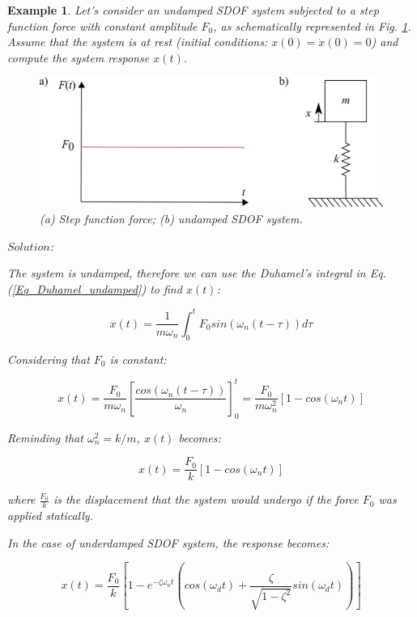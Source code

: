 \documentclass[12pt,letter]{article}
\newtheorem{ex}{Example}
\numberwithin{ex}{section} %
\newenvironment{example}{\begin{mdframed}[middlelinewidth=0.5mm]\begin{ex}\normalfont}{\end{ex}\end{mdframed}}
\numberwithin{re}{section} %
\numberwithin{vcs}{section} %
\begin{document}
\begin{example}
	
	Let's consider an undamped SDOF system subjected to a step function force with constant amplitude $F_0$, as schematically represented in Fig. \ref{fig:step_force}. Assume that the system is at rest (initial conditions: $x(0) = \dot{x}(0) = 0$) and compute the system response $x(t)$. 
	
	\begin{figure}[H]
		\centering
		\includegraphics{../figures/structural_step_function_example.png}
		\caption{(a) Step function force; (b) undamped SDOF system.}
		\label{fig:step_force}
	\end{figure}

\vspace{1ex}
	
\noindent $Solution$:
	
\vspace{1ex}
	
The system is undamped, therefore we can use the Duhamel's integral in Eq. (\ref{Eq_Duhamel_undamped}) to find $x(t)$:

\begin{equation} 
x(t) = \frac{1}{m \omega_n} \int_{0}^{t} F_0 sin(\omega_n (t - \tau)) d\tau 
\end{equation}

Considering that $F_0$ is constant:

\begin{equation}
x(t) = \frac{F_0}{m \omega_n} \left [\frac{cos(\omega_n (t - \tau))}{\omega_n} \right ]_{0}^t = \frac{F_0}{m \omega_n^2} [1 - cos(\omega_n t)]
\end{equation}

Reminding that $\omega_n^2 = k/m$, $x(t)$ becomes:

\begin{equation}
x(t) = \frac{F_0}{k} [1 - cos(\omega_n t)]
\end{equation}

where $\frac{F_0}{k}$ is the displacement that the system would undergo if the force $F_0$ was applied statically.

In the case of underdamped SDOF system, the response becomes:

\begin{equation} 
x(t) = \frac{F_0}{k} \left [1 - e^{-\zeta \omega_n t} \left (cos(\omega_d t) + \frac{\zeta}{\sqrt{1 - \zeta^2}} sin(\omega_d t)\right) \right]
\end{equation}

\end{example}
\end{document}
